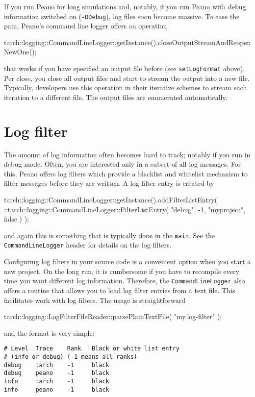 If you run Peano for long simulations and, notably, if you run Peano with debug
information switched on (\texttt{-DDebug}), log files soon become massive.
To ease the pain, Peano's command line logger offers an operation 
\begin{code}
tarch::logging::CommandLineLogger::getInstance().closeOutputStreamAndReopenNewOne();
\end{code} 
\noindent
that works if you have specified an output file before (see
\texttt{setLogFormat} above). Per close, you close all output files and start to
stream the output into a new file.
Typically, developers use this operation in their iterative schemes to stream
each iteration to a different file.
The output files are enumerated automatically.



\section{Log filter}

The amount of log information often becomes hard to track; notably if you run in
debug mode.
Often, you are interested only in a subset of all log messages.
For this, Peano offers log filters which provide a blacklist and whitelist
mechanism to filter messages before they are written.
A log filter entry is created by 
\begin{code}
    tarch::logging::CommandLineLogger::getInstance().addFilterListEntry( 
      ::tarch::logging::CommandLineLogger::FilterListEntry( 
        "debug", -1, "myproject", false ) );
\end{code} 
\noindent
and again this is something that is typically done in the \texttt{main}.
See the \texttt{CommandLineLogger} header for details on the log filters.


Configuring log filters in your source code is a convenient option when you
start a new project.
On the long run, it is cumbersome if you have to recompile every time you want
different log information.
Therefore, the \texttt{CommandLineLogger} also offers a routine that allows you
to load log filter entries from a text file.
This facilitates work with log filters.
The usage is straightforward
\begin{code}
tarch::logging::LogFilterFileReader::parsePlainTextFile( "my.log-filter" );
\end{code}

\noindent
and the format is very simple:
\begin{verbatim}
# Level  Trace    Rank   Black or white list entry
# (info or debug) (-1 means all ranks)
debug    tarch    -1     black
debug    peano    -1     black
info     tarch    -1     black
info     peano    -1     black
\end{verbatim}




